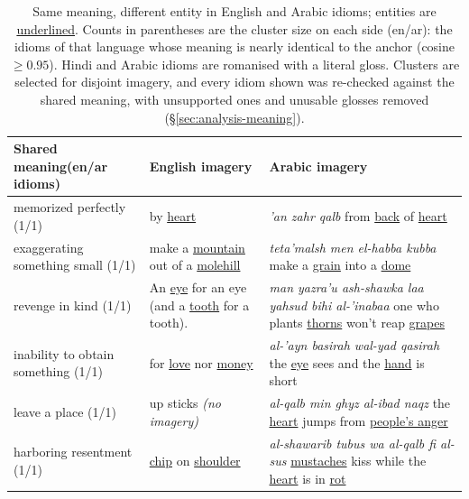 \begin{table}[t]
\centering
\footnotesize
\setlength{\tabcolsep}{4pt}
\renewcommand{\arraystretch}{1.12}
\caption{Same meaning, different entity in \textcolor{encolor}{English} and \textcolor{zhcolor}{Arabic} idioms; entities are \underline{underlined}. Counts in parentheses are the cluster size on each side (en/ar): the idioms of that language whose meaning is nearly identical to the anchor (cosine $\geq 0.95$). Hindi and Arabic idioms are romanised with a literal gloss. Clusters are selected for disjoint imagery, and every idiom shown was re-checked against the shared meaning, with unsupported ones and unusable glosses removed (\S\ref{sec:analysis-meaning}).}
\label{tab:meaning-cases-enar}
\begin{tabular}{@{}p{}p{}p{}@{}}
\toprule
Shared meaning\newline (en/ar idioms) & \textcolor{encolor}{English imagery} & \textcolor{zhcolor}{Arabic imagery} \\
\midrule
memorized perfectly (1/1)
& by \underline{heart}
& \textit{'an zahr qalb} from \underline{back} of \underline{heart} \\
exaggerating something small (1/1)
& make a \underline{mountain} out of a \underline{molehill}
& \textit{teta'malsh men el-habba kubba} make a \underline{grain} into a \underline{dome} \\
revenge in kind (1/1)
& An \underline{eye} for an eye (and a \underline{tooth} for a tooth).
& \textit{man yazra'u ash-shawka laa yahsud bihi al-'inabaa} one who plants \underline{thorns} won't reap \underline{grapes} \\
inability to obtain something (1/1)
& for \underline{love} nor \underline{money}
& \textit{al-'ayn basirah wal-yad qasirah} the \underline{eye} sees and the \underline{hand} is short \\
leave a place (1/1)
& up sticks \textit{(no imagery)}
& \textit{al-qalb min ghyz al-ibad naqz} the \underline{heart} jumps from \underline{people's anger} \\
harboring resentment (1/1)
& \underline{chip} on \underline{shoulder}
& \textit{al-shawarib tubus wa al-qalb fi al-sus} \underline{mustaches} kiss while the \underline{heart} is in \underline{rot} \\
\bottomrule
\end{tabular}
\end{table}
